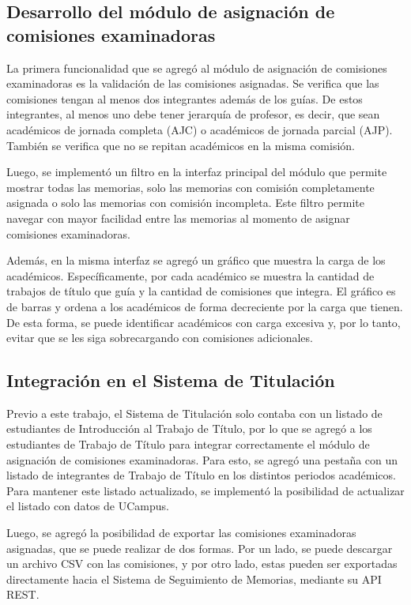 \subsection{Desarrollo del módulo de asignación de comisiones examinadoras}
La primera funcionalidad que se agregó al módulo de asignación de comisiones
examinadoras es la validación de las comisiones asignadas. Se verifica que las
comisiones tengan al menos dos integrantes además de los guías. De estos integrantes,
al menos uno debe tener jerarquía de profesor, es decir, que sean académicos de jornada
completa (AJC) o académicos de jornada parcial (AJP). También se verifica que no
se repitan académicos en la misma comisión.

Luego, se implementó un filtro en la interfaz principal del módulo que permite
mostrar todas las memorias, solo las memorias con comisión completamente asignada o solo
las memorias con comisión incompleta. Este filtro permite navegar con mayor facilidad
entre las memorias al momento de asignar comisiones examinadoras.

Además, en la misma interfaz se agregó un gráfico que muestra la carga de los
académicos. Específicamente, por cada académico se muestra la cantidad de trabajos de título
que guía y la cantidad de comisiones que integra. El gráfico es de barras y ordena
a los académicos de forma decreciente por la carga que tienen. De esta forma,
se puede identificar académicos con carga excesiva y, por lo tanto, evitar que se les
siga sobrecargando con comisiones adicionales.


\subsection{Integración en el Sistema de Titulación}
Previo a este trabajo, el Sistema de Titulación solo contaba con un listado de estudiantes de
Introducción al Trabajo de Título, por lo que se agregó a los estudiantes de
Trabajo de Título para integrar correctamente el módulo de asignación de comisiones
examinadoras. Para esto, se agregó una pestaña con un listado de integrantes de Trabajo
de Título en los distintos periodos académicos. Para mantener este listado actualizado,
se implementó la posibilidad de actualizar el listado con datos de UCampus.

Luego, se agregó la posibilidad de exportar las comisiones examinadoras asignadas, que
se puede realizar de dos formas. Por un lado, se puede descargar un archivo CSV con las
comisiones, y por otro lado, estas pueden ser exportadas directamente hacia el Sistema de
Seguimiento de Memorias, mediante su API REST.


